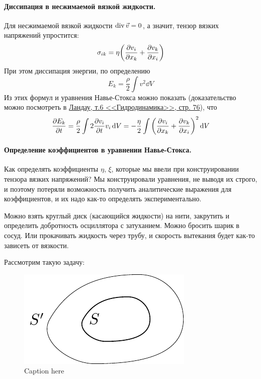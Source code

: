\paragraph{Диссипация в несжимаемой вязкой жидкости.} Для несжимаемой вязкой жидкости $\operatorname{div} \vec{v}=0$, а значит, тензор вязких напряжений упростится:
\begin{equation}
	 \sigma_{ik} = \eta\qty(\pdv{v_i}{x_k}+\pdv{v_k}{x_i})
\end{equation}
При этом диссипация энергии, по определению
\begin{equation}
	E_k = \frac{\rho}{2}\int v^2 \dd{V}
\end{equation}
Из этих формул и уравнения Навье-Стокса можно показать (доказательство можно посмотреть в \href{http://www.immsp.kiev.ua/postgraduate/Biblioteka_trudy/GidrodinamikaLanday1986.pdf#page=76}{Ландау, т.6 <<Гидродинамика>>, стр. 76}), что 
\begin{equation}
    \pdv{E_k}{t} = \frac{\rho}{2} \int 2\pdv{v_i}{t} v_i \dd{V}=
    -\frac{\eta}{2} \int   \qty(\pdv{v_i}{x_k}+\pdv{v_k}{x_i})^2 \dd{V}
\end{equation}

\paragraph{Определение коэффициентов в уравнении Навье-Стокса.} Как определять коэффициенты $\eta$, $\xi$, которые мы ввели при конструировании тензора вязких напряжений? Мы конструировали уравнения, не выводя их строго, и поэтому потеряли возможность получить аналитические выражения для коэффициентов, и их надо как-то определять экспериментально.

Можно взять круглый диск (касающийся жидкости) на нити, закрутить и определить добротность осциллятора с затуханием. Можно бросить шарик в сосуд. Или прокачивать жидкость через трубу, и скорость вытекания будет как-то зависеть от вязкости.

Рассмотрим такую задачу:

\begin{figure}[h!]
    \centering
    \includegraphics[scale=1.25]{img/voda}
    \caption{Caption here}
    \label{fig:figure1}
\end{figure}

